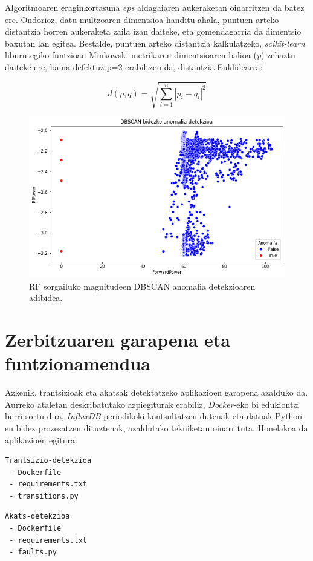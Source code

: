 \documentclass[12pt]{article}
\numberwithin{figure}{section}
\numberwithin{equation}{section}
\begin{document}
Algoritmoaren eraginkortasuna \textit{eps} aldagaiaren aukeraketan oinarritzen da batez ere. Ondorioz, datu-multzoaren dimentsioa handitu ahala, puntuen arteko distantzia horren aukeraketa zaila izan daiteke, eta gomendagarria da dimentsio baxutan lan egitea. Bestalde, puntuen arteko distantzia kalkulatzeko, \textit{scikit-learn} liburutegiko funtzioan Minkowski metrikaren dimentsioaren balioa (\textit{p}) zehaztu daiteke ere, baina defektuz p=2 erabiltzen da, distantzia Euklidearra:

\begin{equation}
    d (p,q) = \sqrt{\sum_{i=1}^n |p_i - q_i|^2}
\end{equation}
\newpage
\begin{figure}[h]
    \centering
    \includegraphics[width=\linewidth]{4 - Detekzio teknikak/dbscan_anomaliak.png}
    \caption{RF sorgailuko magnitudeen DBSCAN anomalia detekzioaren adibidea.}
    \label{fig:dbscan_anomaliak}
\end{figure}

\newpage
\section{Zerbitzuaren garapena eta funtzionamendua}
Azkenik, trantsizioak eta akatsak detektatzeko aplikazioen garapena azalduko da. Aurreko ataletan deskribatutako azpiegiturak erabiliz, \textit{Docker}-eko bi edukiontzi berri sortu dira, \textit{InfluxDB} periodikoki kontsultatzen dutenak eta datuak Python-en bidez prozesatzen dituztenak, azaldutako tekniketan oinarrituta. Honelakoa da aplikazioen egitura:

\begin{multicols}{2}
\begin{verbatim}
Trantsizio-detekzioa
 - Dockerfile
 - requirements.txt
 - transitions.py
\end{verbatim}

\columnbreak

\begin{verbatim}
Akats-detekzioa
 - Dockerfile
 - requirements.txt
 - faults.py
\end{verbatim}
\end{multicols}
\end{document}
